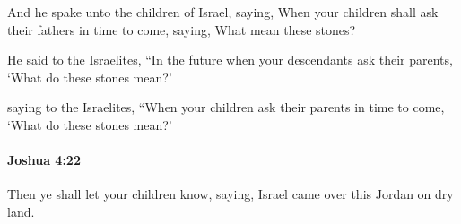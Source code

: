 			\begin{versebox}
					\item[BHS] 
					\item[ASV] And he spake unto the children of Israel, saying, When your children shall ask their fathers in time to come, saying, What mean these stones?
					\item[NIV] He said to the Israelites, “In the future when your descendants ask their parents, ‘What do these stones mean?’
					\item[NRSV] saying to the Israelites, “When your children ask their parents in time to come, ‘What do these stones mean?’
			\end{versebox}

		\paragraph{Joshua 4:22} %
			\label{JOSHUA-4-22}

			Then ye shall let your children know, saying, Israel came over this Jordan on dry land.

